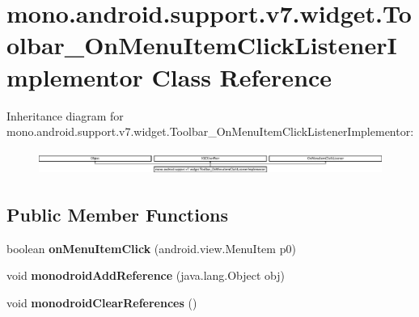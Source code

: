 \hypertarget{classmono_1_1android_1_1support_1_1v7_1_1widget_1_1Toolbar__OnMenuItemClickListenerImplementor}{}\section{mono.\+android.\+support.\+v7.\+widget.\+Toolbar\+\_\+\+On\+Menu\+Item\+Click\+Listener\+Implementor Class Reference}
\label{classmono_1_1android_1_1support_1_1v7_1_1widget_1_1Toolbar__OnMenuItemClickListenerImplementor}
Inheritance diagram for mono.\+android.\+support.\+v7.\+widget.\+Toolbar\+\_\+\+On\+Menu\+Item\+Click\+Listener\+Implementor\+:\begin{figure}[H]
\begin{center}
\leavevmode
\includegraphics[height=0.801144cm]{classmono_1_1android_1_1support_1_1v7_1_1widget_1_1Toolbar__OnMenuItemClickListenerImplementor}
\end{center}
\end{figure}
\subsection*{Public Member Functions}
\begin{DoxyCompactItemize}
\item 
\mbox{\label{classmono_1_1android_1_1support_1_1v7_1_1widget_1_1Toolbar__OnMenuItemClickListenerImplementor_abe3c4f78338e12e9652ab414b15582d9}} 
boolean {\bfseries on\+Menu\+Item\+Click} (android.\+view.\+Menu\+Item p0)
\item 
\mbox{\label{classmono_1_1android_1_1support_1_1v7_1_1widget_1_1Toolbar__OnMenuItemClickListenerImplementor_a6c66afd38fc5d57a713c37f2059db0f0}} 
void {\bfseries monodroid\+Add\+Reference} (java.\+lang.\+Object obj)
\item 
\mbox{\label{classmono_1_1android_1_1support_1_1v7_1_1widget_1_1Toolbar__OnMenuItemClickListenerImplementor_a9e539eca7d6aaa4b43bd92a24f3ffe84}} 
void {\bfseries monodroid\+Clear\+References} ()
\end{DoxyCompactItemize}
